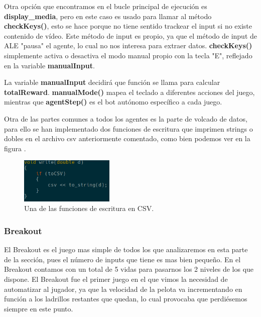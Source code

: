 Otra opción que encontramos en el bucle principal de ejecución es \textbf{display\_media}, pero en este caso es usado para llamar al método \textbf{checkKeys()}, esto se hace porque no tiene sentido trackear el input si no existe contenido de vídeo. Este método de input es propio, ya que el método de input de ALE "pausa" el agente, lo cual no nos interesa para extraer datos. \textbf{checkKeys()} simplemente activa o desactiva el modo manual propio con la tecla "E", reflejado en la variable \textbf{manualInput}.

La variable \textbf{manualInput} decidirá que función se llama para calcular \textbf{totalReward}. \textbf{manualMode()} mapea el teclado a diferentes acciones del juego, mientras que \textbf{agentStep()} es el bot autónomo específico a cada juego.

Otra de las partes comunes a todos los agentes es la parte de volcado de datos, para ello se han implementado dos funciones de escritura que imprimen strings o dobles en el archivo \ac{csv} anteriormente comentado, como bien podemos ver en la figura .

\begin{figure}[h]
	\centering
	\includegraphics[width=0.4\textwidth]{Figures/aledumpcsv}
	\caption{Una de las funciones de escritura en CSV.}
	\label{fig:aledumpcsv}
\end{figure}


\subsubsection{Breakout}
\label{subsec:botsbasicos:breakout}
El Breakout es el juego mas simple de todos los que analizaremos en esta parte de la sección, pues el número de inputs que tiene es mas bien pequeño. En el Breakout contamos con un total de 5 vidas para pasarnos los 2 niveles de los que dispone. El Breakout fue el primer juego en el que vimos la necesidad de automatizar al jugador, ya que la velocidad de la pelota va incrementando en función a los ladrillos restantes que quedan, lo cual provocaba que perdiésemos siempre en este punto.

